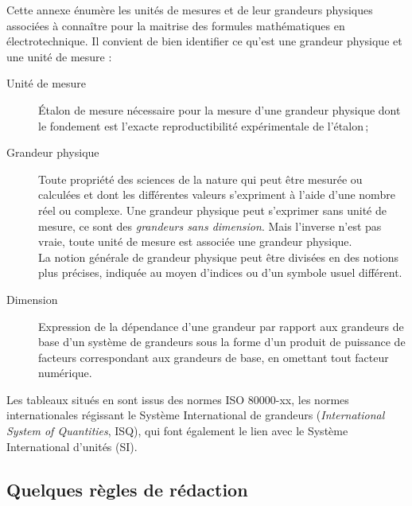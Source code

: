 Cette annexe énumère les unités de mesures et de leur grandeurs physiques associées à connaître pour la maitrise des formules mathématiques en électrotechnique. Il convient de bien identifier ce qu'est une grandeur physique et une unité de mesure :
\begin{description}
\item[Unité de mesure] \'Etalon de mesure nécessaire pour la mesure d'une grandeur physique dont le fondement est l'exacte reproductibilité expérimentale de l'étalon\,;
\item[Grandeur physique] Toute propriété des sciences de la nature qui peut être mesurée ou calculées et dont les différentes valeurs s'expriment à l'aide d'une nombre réel ou complexe. Une grandeur physique peut s'exprimer sans unité de mesure, ce sont des \emph{grandeurs sans dimension}. Mais l'inverse n'est pas vraie, toute unité de mesure est associée une grandeur physique.\\
La notion générale de grandeur physique peut être divisées en des notions plus précises, indiquée au moyen d'indices ou d'un symbole usuel différent.
\item[Dimension] Expression de la dépendance d'une grandeur par rapport aux grandeurs de base d'un système de grandeurs sous la forme d'un produit de puissance de facteurs correspondant aux grandeurs de base, en omettant tout facteur numérique.
\end{description}
Les tableaux situés en  sont issus des normes ISO 80000-xx\supercite{ISO:80000-2013}, les normes internationales régissant le Système International de grandeurs (\emph{International System of Quantities}, ISQ), qui font également le lien avec le Système International d'unités (SI).

\subsection{Quelques règles de rédaction}

